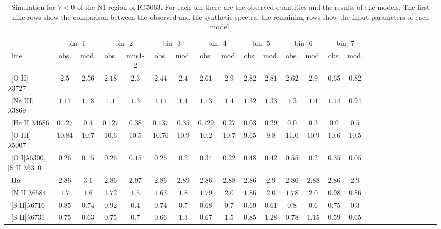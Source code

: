 \documentclass[../thesis.tex]{subfiles}
\begin{document}
\begin{landscape}
\begin{table}
\centering
\caption{Simulation for $V<0$ of the N1 region of IC\,5063. For each bin there are the observed quantities and the results of the models. The first nine rows show the comparison between the observed and the synthetic spectra, the remaining rows show the input parameters of each model.}
\label{tab:sim_n1-}
\footnotesize{
\begin{tabular}{lcccccccccccccccccccccccc} 
 \hline
\ &\multicolumn{2}{c}{bin -1}&\multicolumn{2}{c}{bin -2}&\multicolumn{2}{c}{bin -3}&\multicolumn{2}{c}{bin -4}&\multicolumn{2}{c}{bin -5}&\multicolumn{2}{c}{bin -6}&\multicolumn{2}{c}{bin -7}\\
\   line              &obs.  &mod.&obs.  &mns1-2&obs.&mod. &obs.  &mod.&obs.  &mod. &obs.&mod.& obs. &mod.\\ \hline
\ [O II]$\lambda3727+ $         &$2.5   $&$2.56  $&$2.18   $&$ 2.3  $&$2.44 $&$2.4   $&$2.61  $&$2.9  $&$2.82  $&$2.81  $&$2.62  $&$2.9   $&$ 0.65 $&$ 0.82 $\\
\ [Ne III]$\lambda3869+ $       &$1.17  $&$1.18  $&$1.1    $&$ 1.3  $&$1.11 $&$1.4   $&$1.13  $&$1.4   $&$1.32  $&$1.33  $&$1.3   $&$1.4  $&$ 1.14 $&$ 0.94 $\\
\ [He II]$\lambda4686$           &$0.127 $&$0.4   $&$0.127  $&$ 0.38 $&$0.137$&$0.35  $&$0.129 $&$0.27  $&$0.03  $&$0.29  $&$0.0   $&$0.3  $&$ 0.0  $&$ 0.5 $ \\
\ [O III]$\lambda5007+ $        &$10.84 $&$10.7  $&$ 10.6  $&$ 10.5 $&$10.76$&$10.9  $&$10.2  $&$10.7  $&$  9.65$&$  9.8 $&$11.0  $&$10.9 $&$10.6  $&$10.5$\\
\ [O I]$\lambda6300$,[S II]$\lambda6310$  &$0.26  $&$0.15  $&$0.26   $&$0.15  $&$0.26 $&$0.2   $&$0.34  $&$0.22  $&$0.48  $&$0.42  $&$0.55  $&$0.2  $&$ 0.35 $&$ 0.05$\\
\ $\rm H\alpha$                 &$2.86  $&$3.1   $&$2.86   $&$ 2.97 $&$2.86 $&$2.89  $&$2.86  $&$2.88  $&$2.86  $&$2.9   $&$2.86  $&$2.88 $&$ 2.86 $&$ 2.9 $\\
\ [N II]$\lambda6584$           &$1.7   $&$1.6   $&$1.72   $&$ 1.5  $&$1.63 $&$1.8   $&$1.79  $&$2.0   $&$1.86  $&$2.0   $&$1.78  $&$2.0  $&$ 0.98 $&$ 0.86$\\
\ [S II]$\lambda6716$           &$0.85  $&$0.74  $&$0.92   $&$ 0.4  $&$0.74 $&$0.7   $&$0.68  $&$0.7   $&$0.69  $&$0.61  $&$0.8   $&$0.6  $&$ 0.75$&$ 0.3  $\\
\ [S II]$\lambda6731$            &$0.75  $&$0.63  $&$0.75   $&$ 0.7  $&$0.66 $&$1.3   $&$0.67  $&$1.5   $&$0.85  $&$1.28  $&$0.78  $&$1.15 $&$ 0.59 $&$ 0.65$\\

\end{tabular}}
\end{table}
\end{landscape}
\end{document}
